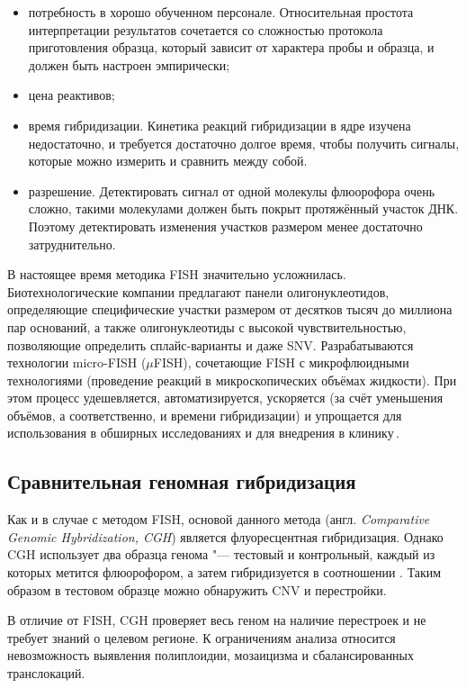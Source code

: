 \documentclass[12pt, twoside, a4paper]{article}
\newcommand{\engterm}[1]{англ. \textenglish{\textit{#1}}}
\begin{document}
\begin{itemize}
	\item потребность в хорошо обученном персонале.
	      Относительная простота интерпретации результатов сочетается со сложностью протокола приготовления образца, который зависит от характера пробы и образца, и должен быть настроен эмпирически;
	\item цена реактивов;
	\item время гибридизации.
	      Кинетика реакций гибридизации в ядре изучена недостаточно, и требуется достаточно долгое время, чтобы получить сигналы, которые можно измерить и сравнить между собой.
	\item разрешение.
	      Детектировать сигнал от одной молекулы флюорофора очень сложно, такими молекулами должен быть покрыт протяжённый участок ДНК.
	      Поэтому детектировать изменения участков размером менее  достаточно затруднительно.
\end{itemize}

В настоящее время методика FISH значительно усложнилась.
Биотехнологические компании предлагают панели олигонуклеотидов, определяющие специфические участки размером от десятков тысяч до миллиона пар оснований, а также олигонуклеотиды с высокой чувствительностью, позволяющие определить сплайс-варианты и даже SNV.
Разрабатываются технологии micro-FISH ($\mu$FISH), сочетающие FISH с микрофлюидными технологиями (проведение реакций в микроскопических объёмах жидкости).
При этом процесс удешевляется, автоматизируется, ускоряется (за счёт уменьшения объёмов, а соответственно, и времени гибридизации) и упрощается для использования в обширных исследованиях и для внедрения в клинику\,\cite{Huber_2018}.

\subsection*{Сравнительная геномная гибридизация}

Как и в случае с методом FISH, основой данного метода (\engterm{Comparative Genomic Hybridization, CGH}) является флуоресцентная гибридизация.
Однако CGH использует два образца генома "--- тестовый и контрольный, каждый из которых метится флюорофором, а затем гибридизуется в соотношении .
Таким образом в тестовом образце можно обнаружить CNV и перестройки.

В отличие от FISH, CGH проверяет весь геном на наличие перестроек и не требует знаний о целевом регионе.
К ограничениям анализа относится невозможность выявления полиплоидии, мозаицизма и сбалансированных транслокаций.
\end{document}
